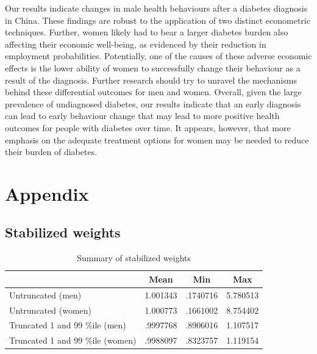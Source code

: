 Our results indicate changes in male health behaviours after a diabetes diagnosis in China. These findings are robust to the application of two distinct econometric techniques. Further, women likely had to bear a larger diabetes burden also affecting their economic well-being, as evidenced by their reduction in employment probabilities. Potentially, one of the causes of these adverse economic effects is the lower ability of women to successfully change their behaviour as a result of the diagnosis. Further research should try to unravel the mechanisms behind these differential outcomes for men and women. Overall, given the large prevalence of undiagnosed diabetes, our results indicate that an early diagnosis can lead to early behaviour change that may lead to more positive health outcomes for people with diabetes over time. It appears, however, that more emphasis on the adequate treatment options for women may be needed to reduce their burden of diabetes. 

\section*{\label{sec:Appendix}Appendix}

\subsection*{Stabilized weights}

\begin{table}[h]
\caption{\label{tab:stabweights}Summary of stabilized weights}
\begin{adjustbox}{max width=\linewidth}  
{
\def\sym#1{\ifmmode^{#1}\else\(^{#1}\)\fi}
\begin{tabular}{l*{1}{ccc}}
\toprule
                    &        Mean&         Min&         Max\\
\midrule
Untruncated (men)   &    1.001343&    .1740716&   5.780513\\
Untruncated (women) &    1.000773&   .1661002&  8.754402\\
Truncated 1 and 99 \%ile (men)&    .9997768&    .8906016&    1.107517\\
Truncated 1 and 99 \%ile (women)&    .9988097&    .8323757&    1.119154\\
\end{tabular}
}
\end{adjustbox}
\end{table}

\FloatBarrier


